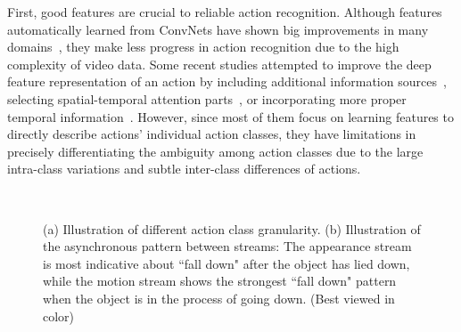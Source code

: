 \documentclass[letterpaper]{article} %
\begin{document}
First, good features are crucial to reliable action recognition. Although features automatically learned from ConvNets have shown big improvements in many domains~\cite{liu2016two,ImageNet,song2017end}, they make less progress in action recognition due to the high complexity of video data. Some recent studies attempted to improve the deep feature representation of an action by including additional information sources~\cite{dutaspatio,3stream,3stream2}, selecting spatial-temporal attention parts~\cite{kar2016adascan,visualattention,KVMF}, or incorporating more proper temporal information~\cite{TSN,cherian2017generalized}. However, since most of them focus on learning features to directly describe actions' individual action classes, they have limitations in precisely differentiating the ambiguity among action classes due to the large intra-class variations and subtle inter-class differences of actions.

\begin{figure}
  \centering
   \\
  \caption{(a) Illustration of different action class granularity. (b) Illustration of the asynchronous pattern between streams: The appearance stream is most indicative about ``fall down" after the object has lied down, while the motion stream shows the strongest ``fall down" pattern when the object is in the process of going down. (Best viewed in color)} %
\end{figure}
\end{document}
